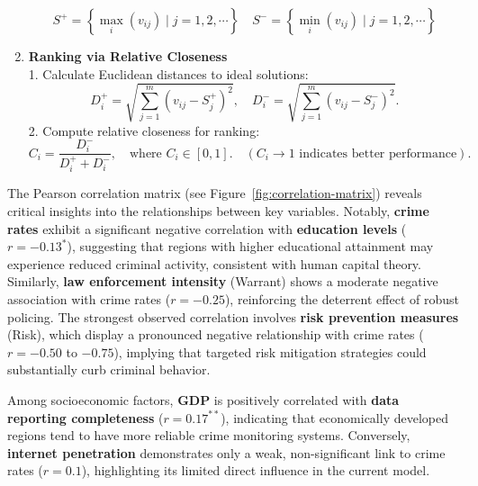 \begin{enumerate}
            \begin{equation}
                S^+ = \left\{ \max_{i}(v_{ij}) \mid j=1,2,\dotsm \right\} \quad S^- = \left\{ \min_{i}(v_{ij}) \mid j=1,2,\dotsm \right\}\label{eq:5-3-4-6}
            \end{equation}
            \item \textbf{Ranking via Relative Closeness} \\
                1. Calculate Euclidean distances to ideal solutions:
            \begin{equation}
                D_i^+ = \sqrt{\sum_{j=1}^m (v_{ij} - S_j^+)^2}, \quad D_i^- = \sqrt{\sum_{j=1}^m (v_{ij} - S_j^-)^2}.\label{eq:5-3-4-7}
            \end{equation}
                2. Compute relative closeness for ranking:
            \begin{equation}
                C_i = \frac{D_i^-}{D_i^+ + D_i^-}, \quad \text{where } C_i \in [0,1]. \quad (C_i \to 1 \text{ indicates better performance}).\label{eq:5-3-4-8}
            \end{equation}
        \end{enumerate}

        The Pearson correlation matrix (see Figure~\ref{fig:correlation-matrix}) reveals critical insights into the relationships between key variables.
        Notably, \textbf{crime rates} exhibit a significant negative correlation with \textbf{education levels} (\(r = -0.13^*\)),
        suggesting that regions with higher educational attainment may experience reduced criminal activity, consistent with human capital theory.
        Similarly, \textbf{law enforcement intensity} (Warrant) shows a moderate negative association with crime rates (\(r = -0.25\)),
        reinforcing the deterrent effect of robust policing.
        The strongest observed correlation involves \textbf{risk prevention measures} (Risk),
        which display a pronounced negative relationship with crime rates (\(r = -0.50\) to \(-0.75\)),
        implying that targeted risk mitigation strategies could substantially curb criminal behavior.

        Among socioeconomic factors, \textbf{GDP} is positively correlated with \textbf{data reporting completeness} (\(r = 0.17^{**}\)),
        indicating that economically developed regions tend to have more reliable crime monitoring systems.
        Conversely, \textbf{internet penetration} demonstrates only a weak, non-significant link to crime rates (\(r = 0.1\)),
        highlighting its limited direct influence in the current model.

